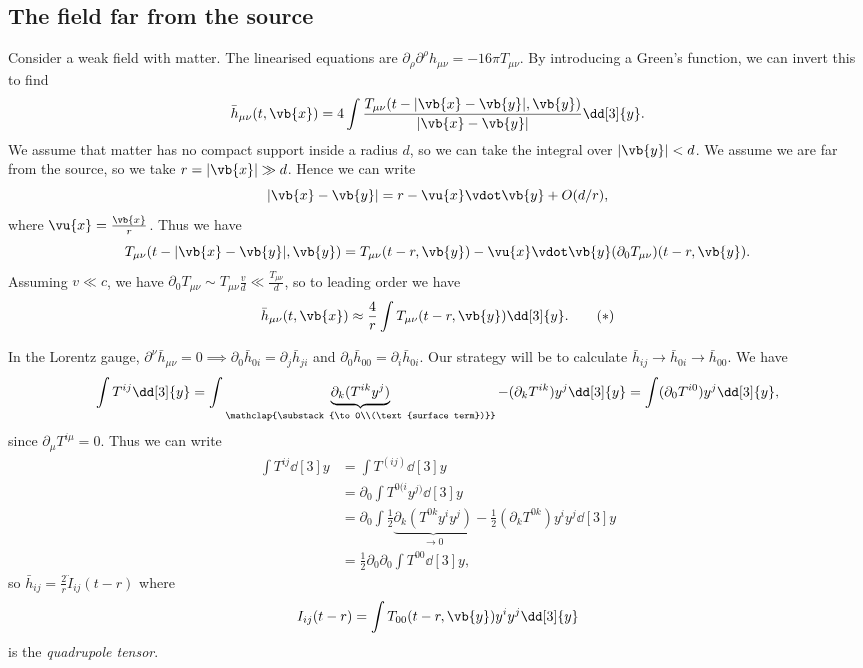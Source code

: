 \documentclass{jknotes}
\begin{document}
\subsection{The field far from the source}
Consider a weak field with matter. The linearised equations are \(\partial_\rho\partial^\rho h_{\mu\nu} = -16\pi T_{\mu\nu}\). By introducing a Green's function, we can invert this to find 
\begin{equation}
    \bar{h}_{\mu\nu}(t,\vb{x}) = 4\int\frac{T_{\mu\nu}(t-|\vb{x}-\vb{y}|,\vb{y})}{|\vb{x}-\vb{y}|}\dd[3]{y}.
\end{equation}
We assume that matter has no compact support inside a radius \(d\), so we can take the integral over \(|\vb{y}| < d\). We assume we are far from the source, so we take \(r=|\vb{x}|\gg d\). Hence we can write
\begin{equation}
    |\vb{x}-\vb{y}| = r - \vu{x}\vdot\vb{y} + O(d/r),
\end{equation}
where \(\vu{x} = \frac{\vb{x}}{r}\). Thus we have
\begin{equation}
    T_{\mu\nu}(t-|\vb{x}-\vb{y}|,\vb{y}) = T_{\mu\nu}(t-r,\vb{y}) - \vu{x}\vdot\vb{y} (\partial_0T_{\mu\nu})(t-r,\vb{y}).
\end{equation}
Assuming \(v\ll c\), we have \(\partial_0 T_{\mu\nu} \sim T_{\mu\nu}\frac{v}{d} \ll \frac{T_{\mu\nu}}{d}\), so to leading order we have
\begin{equation}
    \bar{h}_{\mu\nu}(t,\vb{x}) \approx \frac4r\int T_{\mu\nu}(t-r,\vb{y})\dd[3]{y}.
    \label{invertedlin}
    \tag{\(*\)}
\end{equation}

In the Lorentz gauge, \(\partial^\nu\bar{h}_{\mu\nu} = 0 \implies \partial_0 \bar{h}_{0i} = \partial_j \bar{h}_{ji}\) and \(\partial_0\bar{h}_{00} = \partial_i\bar{h}_{0i}\). Our strategy will be to calculate \(\bar{h}_{ij}\to\bar{h}_{0i}\to\bar{h}_{00}\). We have
\begin{equation}
    \int T^{ij}\dd[3]{y} = \int\underbrace{\partial_k(T^{ik}y^j)}_{\mathclap{\substack{\to0\\(\text{surface term})}}} - (\partial_k T^{ik}) y^j\dd[3]{y} = \int(\partial_0 T^{i0})y^j\dd[3]{y},
\end{equation}
since \(\partial_\mu T^{i\mu} = 0\). Thus we can write
\begin{align}
    \int T^{ij} \dd[3]{y} &= \int T^{(ij)} \dd[3]{y} \\
                     &= \partial_0\int T^{0(i}y^{j)}\dd[3]{y} \\
                     &= \partial_0\int \frac12\underbrace{\partial_k(T^{0k}y^iy^j)}_{\to 0} - \frac12(\partial_k T^{0k})y^i y^j\dd[3]{y} \\
                     &= \frac12 \partial_0\partial_0 \int T^{00}\dd[3]{y},
\end{align}
so \(\bar{h}_{ij} = \frac2r\ddot{I}_{ij}(t-r)\) where
\begin{equation}
    I_{ij}(t-r) = \int T_{00}(t-r,\vb{y})y^iy^j\dd[3]{y}
\end{equation}
is the \emph{quadrupole tensor}.
\end{document}
